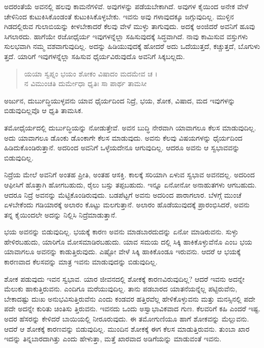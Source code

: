 ಅದರಂತೆಯೆ ಅವನಲ್ಲಿ ಹಲವು ಕಾಮನೆಗಳಿವೆ. ಅವುಗಳನ್ನು ಪಡೆಯಬೇಕಾಗಿದೆ. ಅವುಗಳ ಕೈಯಿಂದ ಅನೇಕ ವೇಳೆ ಚೇಳಿನಿಂದ ಕುಟುಕಿಸಿಕೊಂಡಂತೆ ಕುಟುಕಿಸಿಕೊಳ್ಳಬೇಕು. ಇವನು ಅವು ಗಳಾವುದಕ್ಕೂ ಜಗ್ಗುವುದಿಲ್ಲ. ಮುಳ್ಳಿನ ಗಿಡದಲ್ಲಿರುವ ಗುಲಾಬಿಯನ್ನು ಕೀಳಬೇಕಾದರೆ ಕೆಲವು ವೇಳೆ ಮುಳ್ಳು ತಾಗುವುದು. ಅದಕ್ಕೆ ಅಂಜಿದರೆ ಅವನಿಗೆ ಹೂವು ಸಿಗಲಾರದು. ಹಾಗೆಯೇ ರಜೋಧೈರ್ಯ ಇವುಗಳನ್ನೆಲ್ಲಾ ಸಹಿಸುವುದಕ್ಕೆ ಸಿದ್ಧವಾಗಿದೆ. ನಾವು ಕಾಮಿಸುವ ವಸ್ತುಗಳು ಸುಲಭವಾಗಿ ನಮ್ಮ ವಶವಾಗುವುದಿಲ್ಲ. ಅದನ್ನು ಹಿಡಿಯುವುದಕ್ಕೆ ಹೋದರೆ ಅದು ಒದೆಯುತ್ತದೆ, ಕಚ್ಚುತ್ತದೆ, ಬೊಗುಳು ತ್ತದೆ. ಯಾರಿಗೆ ಇವುಗಳನ್ನೆಲ್ಲಾ ಸಹಿಸುವ ಧೈರ್ಯವಿರುವುದೊ ಅವನಿಗೆ ಸಿಕ್ಕಬಲ್ಲದು.

\begin{verse}
ಯಯಾ ಸ್ವಪ್ನಂ ಭಯಂ ಶೋಕಂ ವಿಷಾದಂ ಮದಮೇವ ಚ ।\\ನ ವಿಮುಂಚತಿ ದುರ್ಮೇಧಾ ಧೃತಿಃ ಸಾ ಪಾರ್ಥ ತಾಮಸೀ 
\end{verse}

{\small ಅರ್ಜುನ, ದುರ್ಬುದ್ಧಿಯುಳ್ಳವನು ಯಾವ ಧೈರ್ಯದಿಂದ ನಿದ್ರೆ, ಭಯ, ಶೋಕ, ವಿಷಾದ, ಮದ ಇವುಗಳನ್ನು ಬಿಡುವುದಿಲ್ಲವೊ ಆ ಧೃತಿ ತಾಮಸಿಕ.}

ತಮೋಧೈರ್ಯದಲ್ಲಿ ದುರ್ಬುದ್ಧಿಯನ್ನು ನೋಡುತ್ತೇವೆ. ಅವನ ಬುದ್ಧಿ ನೇರವಾಗಿ ಯಾವಾಗಲೂ ಕೆಲಸ ಮಾಡುವುದಿಲ್ಲ. ಅದು ಯಾವಾಗಲೂ ಡೊಂಕು ಡೊಂಕಾಗೇ ಕೆಲಸ ಮಾಡುವುದು. ಅವನು ಕೆಲವು ವಿಷಯಗಳನ್ನು ಧೈರ್ಯದಿಂದ ಹಿಡಿದುಕೊಂಡಿರುತ್ತಾನೆ. ಅದರಿಂದ ಅವನಿಗೆ ಒಳ್ಳೆಯದೇನೂ ಆಗುವುದಿಲ್ಲ. ಆದರೂ ಅವನು ಆ ಸ್ವಭಾವವನ್ನು ಬಿಡುವುದಿಲ್ಲ.

ನಿದ್ರೆಯ ಮೇಲೆ ಅವನಿಗೆ ಅಂತಹ ಪ್ರೀತಿ, ಅಂತಹ ಆಸಕ್ತಿ. ಕಾಲಕ್ಕೆ ಸರಿಯಾಗಿ ಏಳುವ ಸ್ವಭಾವ ಅವನದಲ್ಲ. ಅದರಿಂದ ಆಫೀಸಿಗೆ ಹೊತ್ತಾಗಿ ಹೋಗಬಹುದು, ರೈಲು ಬಸ್ಸು ತಪ್ಪಬಹುದು. ಇನ್ನೂ ಏನೋನೋ ಅನಾಹುತಗಳು ಆಗಬಹುದು. ಆದರೂ ನಿದ್ರೆ ಅವನನ್ನು ಮೆಟ್ಟಿಕೊಂಡಿರುವುದು. ಬಡಪೆಟ್ಟಗೆ ಅವನು ಅದರಿಂದ ಪಾರಾಗಲಾರ. ಬೆಳಗ್ಗೆ ಮುಂಚೆ ಏಳಬೇಕೆಂದು ಗಡಿಯಾರಕ್ಕೆ ಅಲಾರಂ ಕೊಟ್ಟು ಮಲಗುತ್ತಾನೆ. ಅಲಾರಂ ಹೊಡೆಯುವುದಕ್ಕೆ ಪ್ರಾರಂಭಿಸಿದರೆ, ಅವನು ತನ್ನ ಕೈಯಿಂದಲೇ ಅದನ್ನು ನಿಲ್ಲಿಸಿ ನಿದ್ರೆಮಾಡುತ್ತಾನೆ.

ಭಯ ಅವನನ್ನು ಬಿಡುವುದಿಲ್ಲ. ಭಯಕ್ಕೆ ಕಾರಣ ಅವನು ಮಾಡಬಾರದುದನ್ನು ಏನೋ ಮಾಡಿರುವನು. ಸುಳ್ಳು ಹೇಳಿರಬಹುದು, ಯಾರಿಗೊ ಮೋಸಮಾಡಿರಬಹುದು. ಯಾವ ಸಮಯ ದಲ್ಲಿ ಸಿಕ್ಕಿ ಹಾಕಿಕೊಳ್ಳುವೆನೊ ಎಂಬ ಭಯ ಯಾವಾಗಲೂ ಅವನನ್ನು ಕಾಡುತ್ತಿರುವುದು. ಎಷ್ಟೋ ವೇಳೆ ಸಿಕ್ಕಿ ಹಾಕಿಕೊಂಡೂ ಇರುವನು. ಆದರೆ ಆ ಭಯಕ್ಕೆ ಕಾರಣವಾದ ಕೆಲಸವನ್ನು ಮಾತ್ರ ಇವನು ಮಾಡುವುದನ್ನು ಬಿಡುವುದಿಲ್ಲ.

ಶೋಕ ಪಡುವುದು ಇವನ ಸ್ವಭಾವ. ಯಾರ ಜೀವನದಲ್ಲಿ ಶೋಕಕ್ಕೆ ಕಾರಣವಿರುವುದಿಲ್ಲ? ಆದರೆ ಇವನು ಅದನ್ನೇ ಮೆಲುಕು ಹಾಕುತ್ತಿರುವನು. ಎಂದಿಗೂ ಮರೆಯುವುದಿಲ್ಲ. ತಾನು ಪಡಬಾರದ ಯಾತನೆಯನ್ನೆಲ್ಲ ಪಟ್ಟಿರುವೆನು, ಬೇಕಾದಷ್ಟು ದುಃಖ ಅನುಭವಿಸುತ್ತಿರುವೆನು ಎಂದು ಕಂಡವರ ಹತ್ತಿರವೆಲ್ಲ ಹೇಳಿಕೊಳ್ಳುವನು ಮತ್ತು ಮನಸ್ಸಿನಲ್ಲಿ ಪದೇ ಪದೇ ಅದನ್ನೇ ಕುರಿತು ಚಿಂತಿಸು ತ್ತಿರುವನು. ಇವನದು ಒಂದು ಅಸ್ವಾಭಾವಿಕವಾದ ಗುಣ. ಕೆಲವರಿಗೆ ಕಹಿ ಎಂದರೆ ಇಷ್ಟ. ಅದರ ಹೆಸರನ್ನು ಕೇಳಿದರೆ ಬಾಯಿಯಲ್ಲಿ ನೀರೂರುವುದು. ಈ ತಮೋಗುಣಿಯೂ ಹಾಗೆ ಶೋಕವನ್ನು ಮೆಲ್ಲುವನು. ಆದರೆ ಆ ಶೋಕಕ್ಕೆ ಕಾರಣವನ್ನು ಬಿಡುವುದಿಲ್ಲ. ಮುಂದಿನ ಶೋಕಕ್ಕೆ ಈಗ ಕೆಲಸ ಮಾಡುತ್ತಿರುವನು. ತುಂಬಾ ಖಾರ ಇದನ್ನು ತಿನ್ನಬಾರದಾಗಿತ್ತು ಎಂದು ಹೇಳುತ್ತಾ, ಮತ್ತೆ ಖಾರವಾದ ಅಡಿಗೆಯನ್ನು ಮಾಡುವಂತೆ ಇವನು.

